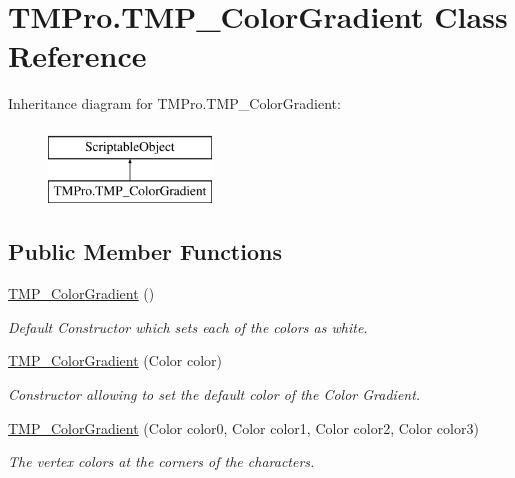 \hypertarget{class_t_m_pro_1_1_t_m_p___color_gradient}{}\section{T\+M\+Pro.\+T\+M\+P\+\_\+\+Color\+Gradient Class Reference}
\label{class_t_m_pro_1_1_t_m_p___color_gradient}
Inheritance diagram for T\+M\+Pro.\+T\+M\+P\+\_\+\+Color\+Gradient\+:\begin{figure}[H]
\begin{center}
\leavevmode
\includegraphics[height=2.000000cm]{class_t_m_pro_1_1_t_m_p___color_gradient}
\end{center}
\end{figure}
\subsection*{Public Member Functions}
\begin{DoxyCompactItemize}
\item 
\mbox{\hyperlink{class_t_m_pro_1_1_t_m_p___color_gradient_ade6a10f2d14048890c9e4d93c8f33012}{T\+M\+P\+\_\+\+Color\+Gradient}} ()
\begin{DoxyCompactList}\small\item\em Default Constructor which sets each of the colors as white. \end{DoxyCompactList}\item 
\mbox{\hyperlink{class_t_m_pro_1_1_t_m_p___color_gradient_ad8a5ef960c6adff7252e289593bbcbd2}{T\+M\+P\+\_\+\+Color\+Gradient}} (Color color)
\begin{DoxyCompactList}\small\item\em Constructor allowing to set the default color of the Color Gradient. \end{DoxyCompactList}\item 
\mbox{\hyperlink{class_t_m_pro_1_1_t_m_p___color_gradient_acfc78a5c6cb6511ef9f6b9c8c13d1748}{T\+M\+P\+\_\+\+Color\+Gradient}} (Color color0, Color color1, Color color2, Color color3)
\begin{DoxyCompactList}\small\item\em The vertex colors at the corners of the characters. \end{DoxyCompactList}\end{DoxyCompactItemize}
